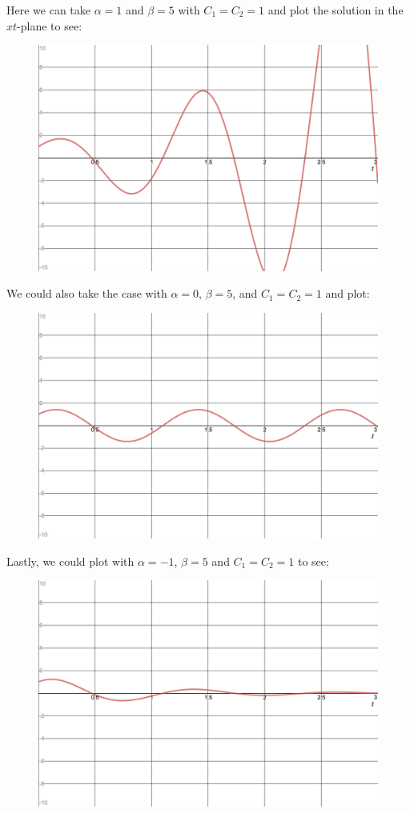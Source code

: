 \begin{itemize}
            Here we can take $\alpha = 1$ and $\beta =5$ with $C_1=C_2=1$ and plot the solution in the $xt$-plane to see:
            \begin{figure}[H]
                \centering
                \includegraphics[width=.7\textwidth]{Figures_Part_2/a=1-b=5.png}
            \end{figure}
            We could also take the case with $\alpha=0$, $\beta=5$, and $C_1=C_2=1$ and plot:
            \begin{figure}[H]
                \centering
                \includegraphics[width=.7\textwidth]{Figures_Part_2/a=0-b=5.png}
            \end{figure}
            Lastly, we could plot with $\alpha=-1$, $\beta =5$ and $C_1=C_2=1$ to see:
                        \begin{figure}[H]
                \centering
                \includegraphics[width=.7\textwidth]{Figures_Part_2/a=-1-b=5.png}
            \end{figure}
        \end{itemize}


